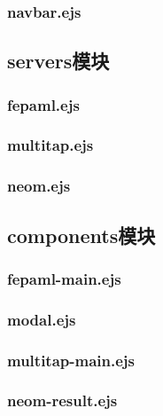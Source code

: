 \subsubsection{navbar.ejs}

\subsection{servers模块}
\subsubsection{fepaml.ejs}

\subsubsection{multitap.ejs}

\subsubsection{neom.ejs}

\subsection{components模块}
\subsubsection{fepaml-main.ejs}

\subsubsection{modal.ejs}

\subsubsection{multitap-main.ejs}

\subsubsection{neom-result.ejs}

